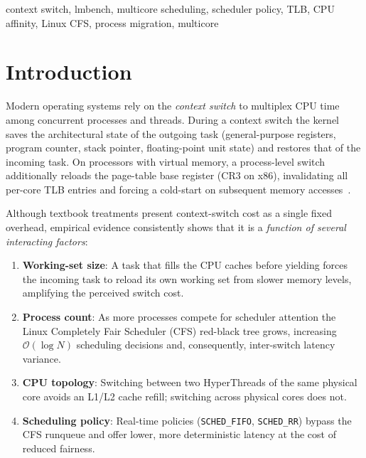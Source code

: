 \documentclass[conference]{IEEEtran}
\begin{document}
\begin{IEEEkeywords}
context switch, lmbench, multicore scheduling, scheduler policy,
TLB, CPU affinity, Linux CFS, process migration, multicore
\end{IEEEkeywords}

\section{Introduction}

Modern operating systems rely on the \emph{context switch} to
multiplex CPU time among concurrent processes and threads.
During a context switch the kernel saves the architectural state
of the outgoing task (general-purpose registers, program counter,
stack pointer, floating-point unit state) and restores that of the
incoming task.  On processors with virtual memory, a process-level
switch additionally reloads the page-table base register (CR3 on
x86), invalidating all per-core TLB entries and forcing a cold-start
on subsequent memory accesses~\cite{drepper2007memory}.

Although textbook treatments present context-switch cost as a single
fixed overhead, empirical evidence consistently shows that it is a
\emph{function of several interacting factors}:
%
\begin{enumerate}
  \item \textbf{Working-set size}: A task that fills the CPU caches
        before yielding forces the incoming task to reload its own
        working set from slower memory levels, amplifying the
        perceived switch cost.
  \item \textbf{Process count}: As more processes compete for
        scheduler attention the Linux Completely Fair Scheduler (CFS)
        red-black tree grows, increasing $\mathcal{O}(\log N)$ scheduling
        decisions and, consequently, inter-switch latency variance.
  \item \textbf{CPU topology}: Switching between two HyperThreads of
        the same physical core avoids an L1/L2 cache refill; switching
        across physical cores does not.
  \item \textbf{Scheduling policy}: Real-time policies
        (\texttt{SCHED\_FIFO}, \texttt{SCHED\_RR}) bypass the CFS
        runqueue and offer lower, more deterministic latency at the
        cost of reduced fairness.
\end{enumerate}
\end{document}
